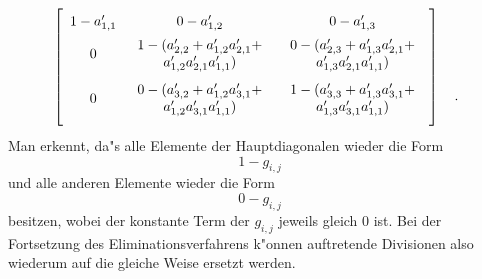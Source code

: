 \[
    \left[
        \begin{array}{ccc}
            1 - a_{1,1}'
        &   0 - a_{1,2}'
        &   0 - a_{1,3}' \MatStrut
        \\     0
        &   \begin{array}{c}
                1 - (a_{2,2}' + a_{1,2}'a_{2,1}' +
            \\   a_{1,2}'a_{2,1}'a_{1,1}')
            \end{array}
        &   \begin{array}{c}
                0 - (a_{2,3}'  + a_{1,3}'a_{2,1}' +
            \\  a_{1,3}'a_{2,1}'a_{1,1}')
            \end{array} \LMatStrut
        \\     0
        &   \begin{array}{c}
                0 - (a_{3,2}' + a_{1,2}'a_{3,1}' +
            \\  a_{1,2}'a_{3,1}'a_{1,1}')
            \end{array}
        &   \begin{array}{c}
                1 - (a_{3,3}' + a_{1,3}'a_{3,1}' +
            \\  a_{1,3}'a_{3,1}'a_{1,1}')
            \end{array} \LMatStrut
        \end{array}
    \right]
    \begin{array}{c}
        \MatStrut \\ \LMatStrut \\ \MyPunkt \LMatStrut
    \end{array}
\]
Man erkennt, da"s alle Elemente der Hauptdiagonalen wieder die Form
\[ 1 - g_{i,j} \] und alle anderen Elemente wieder die Form
\[ 0 - g_{i,j} \] besitzen, wobei der konstante Term der $g_{i,j}$ jeweils
gleich $0$ ist. Bei der Fortsetzung des Eliminationsverfahrens k"onnen 
auftretende Divisionen also wiederum auf die gleiche Weise ersetzt werden.

